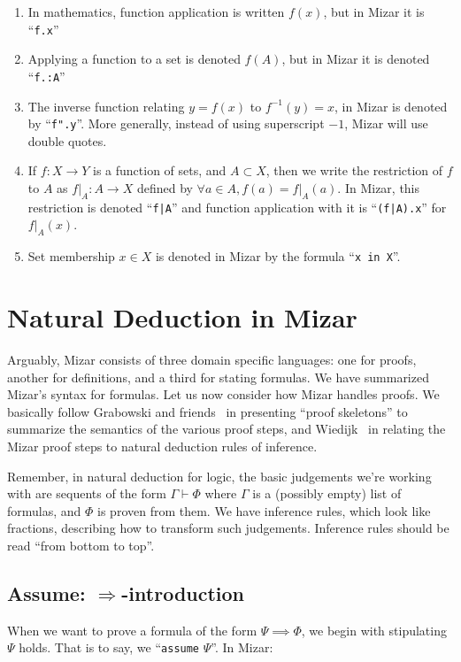 \begin{enumerate}
\item{} In mathematics, function application is written $f(x)$, but in
  Mizar it is ``\texttt{f.x}''
\item{} Applying a function to a set is denoted $f(A)$, but in Mizar it is
  denoted ``\texttt{f.:A}''
\item{} The inverse function relating $y=f(x)$ to $f^{-1}(y)=x$, in Mizar
  is denoted by ``\texttt{f".y}''. More generally, instead of using
  superscript $-1$, Mizar will use double quotes.
\item{} If $f\colon X\to Y$ is a function of sets, and $A\subset X$, then
  we write the restriction of $f$ to $A$ as $f|_{A}\colon A\to X$
  defined by $\forall a\in A, f(a)=f|_{A}(a)$. In Mizar, this
  restriction is denoted ``\lstinline{f|A}'' and function application with it
  is ``\lstinline{(f|A).x}'' for $f|_{A}(x)$.
\item{} Set membership $x\in X$ is
  denoted in Mizar by the formula ``\verb#x in X#''.
\end{enumerate}

\section{Natural Deduction in Mizar}

Arguably, Mizar consists of three domain specific languages: one for
proofs, another for definitions, and a third for stating formulas. We
have summarized Mizar's syntax for formulas. Let us now consider how
Mizar handles proofs. We basically follow Grabowski and
friends~\cite{grabowski2010mizar} in presenting ``proof skeletons'' to
summarize the semantics of the various proof steps, and
Wiedijk~\cite{wiedijk2000mv} in relating the Mizar proof steps to
natural deduction rules of inference.

Remember, in natural deduction for logic, the basic judgements we're
working with are sequents of the form $\Gamma\vdash\Phi$ where $\Gamma$
is a (possibly empty) list of formulas, and $\Phi$ is proven from
them. We have inference rules, which look like fractions, describing how
to transform such judgements. Inference rules should be read ``from
bottom to top''.

\subsection{Assume: $\Longrightarrow$-introduction}
When we want to prove a formula of the form $\Psi\implies\Phi$, we begin
with stipulating $\Psi$ holds. That is to say, we ``\verb#assume# $\Psi$''.
In Mizar:

